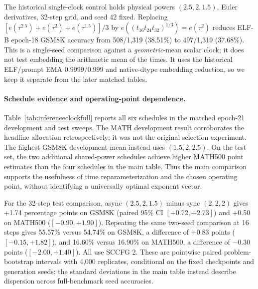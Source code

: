 The historical single-clock control holds physical powers $(2.5,2,1.5)$, Euler derivatives, 32-step grid, and seed 42 fixed. Replacing $[e(\tau^{2.5})+e(\tau^2)+e(\tau^{1.5})]/3$ by $e((t_{16}t_{24}t_{32})^{1/3})=e(\tau^2)$ reduces ELF-B epoch-18 GSM8K accuracy from 508/1,319 (38.51\%) to 497/1,319 (37.68\%). This is a single-seed comparison against a \emph{geometric}-mean scalar clock; it does not test embedding the arithmetic mean of the times. It uses the historical ELF/prompt EMA $0.9999/0.999$ and native-dtype embedding reduction, so we keep it separate from the later matched tables.

\paragraph{Schedule evidence and operating-point dependence.}
Table~\ref{tab:inferenceclockfull} reports all six schedules in the matched epoch-21 development and test sweeps. The MATH development result corroborates the headline allocation retrospectively; it was not the original selection experiment. The highest GSM8K development mean instead uses $(1.5,2,2.5)$. On the test set, the two additional shared-power schedules achieve higher MATH500 point estimates than the four schedules in the main table. Thus the main comparison supports the usefulness of time reparameterization and the chosen operating point, without identifying a universally optimal exponent vector.



For the 32-step test comparison, async $(2.5,2,1.5)$ minus sync $(2,2,2)$ gives +1.74 percentage points on GSM8K (paired 95\% CI $[+0.72,+2.73]$) and +0.50 on MATH500 ($[-0.90,+1.90]$). Repeating the same two-seed comparison at 16 steps gives 55.57\% versus 54.74\% on GSM8K, a difference of +0.83 points ($[-0.15,+1.82]$), and 16.60\% versus 16.90\% on MATH500, a difference of $-0.30$ points ($[-2.00,+1.40]$). All use SCCFG 2. These are pointwise paired problem-bootstrap intervals with 4,000 replicates, conditional on the fixed checkpoints and generation seeds; the standard deviations in the main table instead describe dispersion across full-benchmark seed accuracies.

